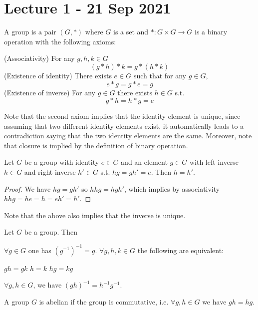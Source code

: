 \section{Lecture 1 - 21 Sep 2021} 
\begin{definition}
  A group is a pair $(G,*)$ where $G$ is a set and $*:G\times G\to G$ is a binary
  operation with the following axioms:
  \begin{itemize}
      \ii (Associativity) For any $g,h,k\in G$
      \[(g*h)*k = g*(h*k)\]
      \ii (Existence of identity) There exists $e\in G$ such that for any $g\in G$,
      \[e*g=g*e = g\]
      \ii (Existence of inverse) For any $g\in G$ there exists $h\in G$ s.t. 
      \[g*h=h*g=e\]
  \end{itemize}
  \label{group}
\end{definition}
Note that the second axiom implies that the identity element is unique, since assuming
that two different identity elements exist, it automatically leads to a contradiction
saying that the two identity elements are the same. Moreover, note that closure is implied
by the definition of binary operation.

\begin{theorem}
  Let $G$ be a group with identity $e\in G$ and an element $g\in G$ with left inverse
  $h\in G$ and right inverse $h'\in G$ s.t. $hg = gh'=e$. Then $h=h'$.
\end{theorem}
\begin{proof}
  We have $hg=gh'$ so $hhg=hgh'$, which implies by associativity $hhg=he=h=eh'=h'$.
\end{proof}
Note that the above also implies that the inverse is unique.


\begin{theorem}
  Let $G$ be a group. Then
  \begin{itemize}
      \ii $\forall g\in G$ one has $(g^{-1})^{-1} = g$.
      \ii $\forall g,h,k\in G$ the following are equivalent:
      \begin{itemize}
        \ii $gh = gk$
        \ii $h=k$
        \ii $hg=kg$
      \end{itemize}
      \ii $\forall  g,h\in G$, we have $(gh)^{-1} = h^{-1} g^{-1}$.
  \end{itemize}
\end{theorem}

\begin{definition}
  A group $G$ is abelian if the group is commutative, i.e. $\forall g,h\in G$ we have
  $gh=hg$.
  \label{abelianGroup}
\end{definition}

